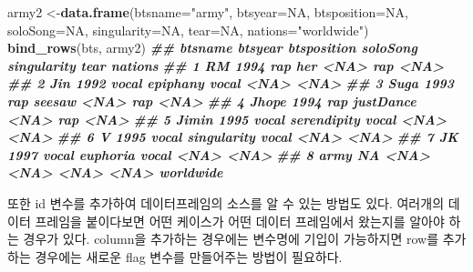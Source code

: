 \documentclass[
]{book}
\newenvironment{Shaded}{\begin{snugshade}}{\end{snugshade}}
\newcommand{\AttributeTok}[1]{\textcolor[rgb]{0.13,0.29,0.53}{#1}}
\newcommand{\ConstantTok}[1]{\textcolor[rgb]{0.56,0.35,0.01}{#1}}
\newcommand{\DocumentationTok}[1]{\textcolor[rgb]{0.56,0.35,0.01}{\textbf{\textit{#1}}}}
\newcommand{\FunctionTok}[1]{\textcolor[rgb]{0.13,0.29,0.53}{\textbf{#1}}}
\newcommand{\NormalTok}[1]{#1}
\newcommand{\OtherTok}[1]{\textcolor[rgb]{0.56,0.35,0.01}{#1}}
\newcommand{\StringTok}[1]{\textcolor[rgb]{0.31,0.60,0.02}{#1}}
\begin{document}
\begin{Shaded}
\begin{Highlighting}[]
\NormalTok{army2 }\OtherTok{\textless{}{-}}\FunctionTok{data.frame}\NormalTok{(}\AttributeTok{btsname=}\StringTok{"army"}\NormalTok{, }\AttributeTok{btsyear=}\ConstantTok{NA}\NormalTok{, }\AttributeTok{btsposition=}\ConstantTok{NA}\NormalTok{, }\AttributeTok{soloSong=}\ConstantTok{NA}\NormalTok{, }\AttributeTok{singularity=}\ConstantTok{NA}\NormalTok{, }\AttributeTok{tear=}\ConstantTok{NA}\NormalTok{, }\AttributeTok{nations=}\StringTok{"worldwide"}\NormalTok{)}
\FunctionTok{bind\_rows}\NormalTok{(bts, army2)}
\DocumentationTok{\#\#   btsname btsyear btsposition    soloSong singularity tear   nations}
\DocumentationTok{\#\# 1      RM    1994         rap         her        \textless{}NA\textgreater{}  rap      \textless{}NA\textgreater{}}
\DocumentationTok{\#\# 2     Jin    1992       vocal    epiphany       vocal \textless{}NA\textgreater{}      \textless{}NA\textgreater{}}
\DocumentationTok{\#\# 3    Suga    1993         rap      seesaw        \textless{}NA\textgreater{}  rap      \textless{}NA\textgreater{}}
\DocumentationTok{\#\# 4   Jhope    1994         rap   justDance        \textless{}NA\textgreater{}  rap      \textless{}NA\textgreater{}}
\DocumentationTok{\#\# 5   Jimin    1995       vocal serendipity       vocal \textless{}NA\textgreater{}      \textless{}NA\textgreater{}}
\DocumentationTok{\#\# 6       V    1995       vocal singularity       vocal \textless{}NA\textgreater{}      \textless{}NA\textgreater{}}
\DocumentationTok{\#\# 7      JK    1997       vocal    euphoria       vocal \textless{}NA\textgreater{}      \textless{}NA\textgreater{}}
\DocumentationTok{\#\# 8    army      NA        \textless{}NA\textgreater{}        \textless{}NA\textgreater{}        \textless{}NA\textgreater{} \textless{}NA\textgreater{} worldwide}
\end{Highlighting}
\end{Shaded}

또한 id 변수를 추가하여 데이터프레임의 소스를 알 수 있는 방법도 있다. 여러개의 데이터 프레임을 붙이다보면 어떤 케이스가 어떤 데이터 프레임에서 왔는지를 알아야 하는 경우가 있다. column을 추가하는 경우에는 변수명에 기입이 가능하지면 row를 추가하는 경우에는 새로운 flag 변수를 만들어주는 방법이 필요하다.
\end{document}
